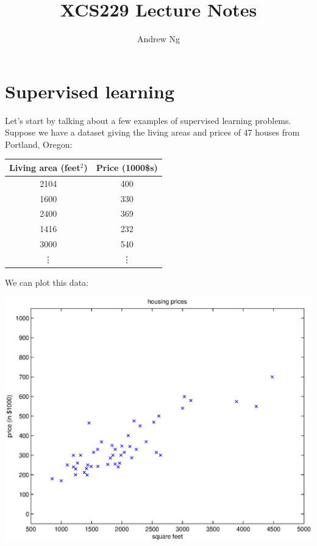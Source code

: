 \documentclass{article}
\begin{document}
\title{XCS229 Lecture Notes}
\author{Andrew Ng}
\date{}
\maketitle


\section*{Supervised learning}


Let's start by talking about a few examples of supervised learning problems.
Suppose we have a dataset giving the living areas and prices of 47 houses from
Portland, Oregon:
%
\begin{center}
\begin{tabular}{c|c}
Living area (feet$^2$) & Price (1000\$s) \\ \hline
2104 & 400  \\
1600 & 330  \\
2400 & 369  \\
1416 & 232  \\
3000 & 540  \\
\vdots & \vdots
\end{tabular}
\end{center}

We can plot this data:
\begin{center}
\includegraphics[scale=0.4]{housingData.eps}
\end{center}
\end{document}
